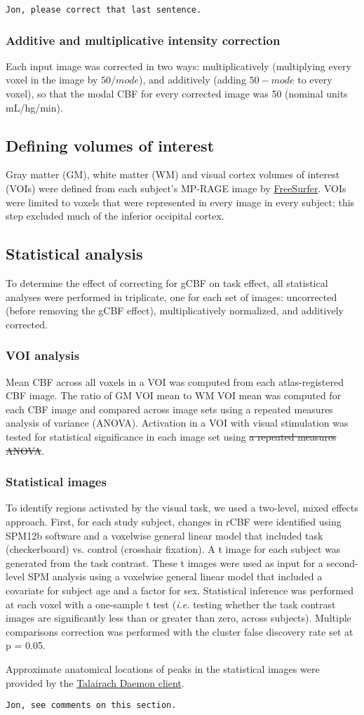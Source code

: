 \verb|Jon, please correct that last sentence.|
\subsubsection{Additive and multiplicative intensity correction}
Each input image was corrected in two ways: multiplicatively (multiplying every voxel in the image by $50/mode$), and additively (adding $50-mode$ to every voxel), so that the modal CBF for every corrected image was 50 (nominal units mL/hg/min).

\subsection{Defining volumes of interest}
Gray matter (GM), white matter (WM) and visual cortex volumes of interest (VOIs) were defined from each subject's MP-RAGE image by \href{https://surfer.nmr.mgh.harvard.edu/}{FreeSurfer}.\cite{Desikan2006968} VOIs were limited to voxels that were represented in every image in every subject; this step excluded much of the inferior occipital cortex.\cite{Black_2010} 

\subsection{Statistical analysis}
To determine the effect of correcting for gCBF on task effect, all statistical analyses were performed in triplicate, one for each set of images: uncorrected (before removing the gCBF effect), multiplicatively normalized, and additively corrected.

\subsubsection{VOI analysis}
Mean CBF across all voxels in a VOI was computed from each atlas-registered CBF image. The ratio of GM VOI mean to WM VOI mean was computed for each CBF image and compared across image sets using a repeated measures analysis of variance (ANOVA). Activation in a VOI with visual stimulation was tested for statistical significance in each image set using \sout{a repeated measures ANOVA}. 

\subsubsection{Statistical images}
To identify regions activated by the visual task, we used a two-level, mixed effects approach.  First, for each study subject, changes in rCBF were identified using SPM12b software and a voxelwise general linear model that included task (checkerboard) vs. control (crosshair fixation). A t image for each subject was generated from the task contrast. These t images were used as input for a second-level SPM analysis using a voxelwise general linear model that included a covariate for subject age and a factor for sex. Statistical inference was performed at each voxel with a one-sample t test (\textit{i.e.} testing whether the task contrast images are significantly less than or greater than zero, across subjects). Multiple comparisons correction was performed with the cluster false discovery rate set at p = 0.05. 

Approximate anatomical locations of peaks in the statistical images were provided by the \href{http://www.talairach.org}{Talairach Daemon client}.\cite{20408222,10912591}

\verb|Jon, see comments on this section.|